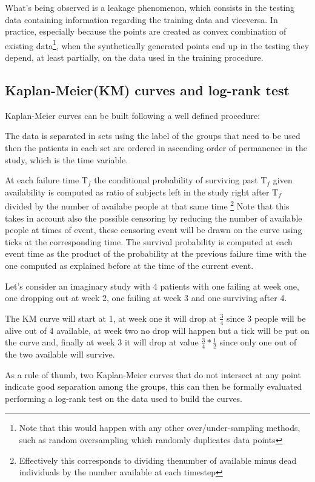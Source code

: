What's being observed is a leakage phenomenon, which consists in the testing data containing information regarding the training data and viceversa. In practice, especially because the points are created as convex combination of existing data\footnote{Note that this would happen with any other over/under-sampling methods, such as random oversampling which randomly duplicates data points}, when the synthetically generated points end up in the testing they depend, at least partially, on the data used in the training procedure.


\subsection{Kaplan-Meier(KM) curves and log-rank test}
Kaplan-Meier curves can be built following a well defined procedure: 

The data is separated in sets using the label of the groups that need to be used then the patients in each set are ordered in ascending order of permanence in the study, which is the time variable.

At each failure time T$_f$ the conditional probability of surviving past T$_f$ given availability is computed as ratio of subjects left in the study right after T$_f$ divided by the number of availabe people at that same time
\footnote{Effectively this corresponds to dividing thenumber of available minus dead individuals by the number available at each timestep}
Note that this takes in account also the possible censoring by reducing the number of available people at times of event, these censoring event will be drawn on the curve using ticks at the corresponding time.
The survival probability is computed at each event time as the product of the probability at the previous failure time with the one computed as explained before at the time of the current event.

Let's consider an imaginary study with 4 patients with one failing at week one, one dropping out at week 2, one failing at week 3 and one surviving after 4.

The KM curve will start at 1, at week one it will drop at $\frac{3}{4}$ since 3 people will be alive out of 4 available, at week two no drop will happen but a tick will be put on the curve and, finally at week 3 it will drop at value $\frac{3}{4}*\frac{1}{2}$ since only one out of the two available will survive.

As a rule of thumb, two Kaplan-Meier curves that do not intersect at any point indicate good separation among the groups, this can then be formally evaluated performing a log-rank test on the data used to build the curves.

